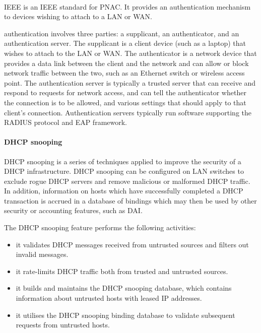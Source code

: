 \paragraph{}
\acs{IEEE}  is an \acs{IEEE} standard for \ac{PNAC}.
It provides an authentication mechanism to devices wishing to attach to a \ac{LAN} or \ac{WAN}.

 authentication involves three parties: a supplicant, an authenticator, and an authentication server.
The supplicant is a client device (such as a laptop) that wishes to attach to the \ac{LAN} or \ac{WAN}.
The authenticator is a network device that provides a data link between the client and the network and can allow or block network traffic between the two, such as an Ethernet switch or wireless access point.
The authentication server is typically a trusted server that can receive and respond to requests for network access, and can tell the authenticator whether the connection is to be allowed, and various settings that should apply to that client's connection.
Authentication servers typically run software supporting the \ac{RADIUS} protocol and \ac{EAP} framework.

\paragraph{\acs{DHCP} snooping}
\ac{DHCP} snooping is a series of techniques applied to improve the security of a \ac{DHCP} infrastructure.
\ac{DHCP} snooping can be configured on \ac{LAN} switches to exclude rogue \ac{DHCP} servers and remove malicious or malformed \ac{DHCP} traffic.
In addition, information on hosts which have successfully completed a \ac{DHCP} transaction is accrued in a database of bindings which may then be used by other security or accounting features, such as \acl{DAI}.

The \ac{DHCP} snooping feature performs the following activities:
\begin{itemize}
\item it validates \acs{DHCP} messages received from untrusted sources and filters out invalid messages.
\item it rate-limits \acs{DHCP} traffic both from trusted and untrusted sources.
\item it builds and maintains the \acs{DHCP} snooping database, which contains information about untrusted hosts with leased \acs{IP} addresses.
\item it utilises the \acs{DHCP} snooping binding database to validate subsequent requests from untrusted hosts.
\end{itemize}

